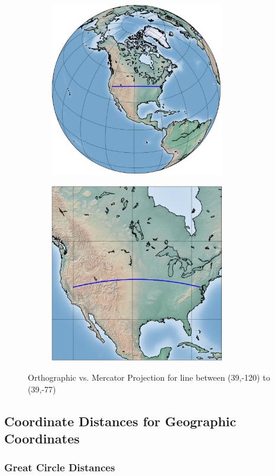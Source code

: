 \begin{figure}[!h]
\begin{subfigure}[b]{3in}
\includegraphics[width=3in]{chapter3/diagrams/figure_1.png}
\end{subfigure}
\begin{subfigure}[b]{3in}
\includegraphics[width=3in]{chapter3/diagrams/figure_2.png}
\end{subfigure}
\caption{Orthographic vs. Mercator Projection for line between (39,-120) to (39,-77)}
\label{fig:ortho_vs_merc}
\end{figure}


\subsection*{Coordinate Distances for Geographic Coordinates}


\subsubsection*{Great Circle Distances}

